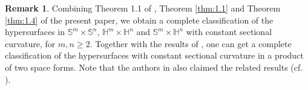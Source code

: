 \documentclass[reqno]{amsart}%
\theoremstyle{definition}
\newtheorem{remark}{Remark}[section]
\numberwithin{equation}{section}
\begin{document}
\begin{remark}
Combining Theorem 1.1 of \cite{LVWY}, Theorem \ref{thm:1.1}  and Theorem \ref{thm:1.4} of the present paper, we 
obtain a complete classification of the hypersurfaces in $\mathbb{S}^m\times \mathbb{S}^n$, 
$\mathbb{H}^m\times \mathbb{H}^n$ and $\mathbb{S}^m\times \mathbb{H}^n$
with constant sectional curvature, for $m,n\geq2$. 
Together with the results of \cite{AEG,CT2025,M-T}, one can get a complete classification of the hypersurfaces with constant sectional curvature in a product of two space forms. Note that the authors in \cite{CT2025} also claimed the related results (cf. \cite{KNT}). 
\end{remark} 
\end{document}
